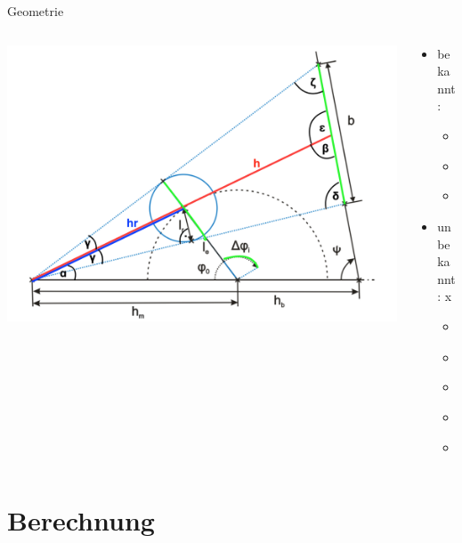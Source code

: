 \documentclass[compress]{beamer}
\begin{document}
\begin{frame}{Geometrie}
	\begin{columns}
		\begin{column}{0.68\linewidth}
			\centering
			\includegraphics[width=\linewidth]{images/edited.png}
		\end{column}
		\begin{column}{0.3\linewidth}
			\begin{itemize}
				\item bekannt:
				\begin{itemize}
					\item b
					\item $l_r$
					\item $\Delta \phi_i$
				\end{itemize}
				\item unbekannt: x
				\begin{itemize}
					\item $\phi_0$
					\item $l_e$
					\item $h_m$
					\item $h_b$
					\item $\psi$
				\end{itemize}
			\end{itemize}
		\end{column}
	\end{columns}
\end{frame}

\section{Berechnung}
\end{document}
